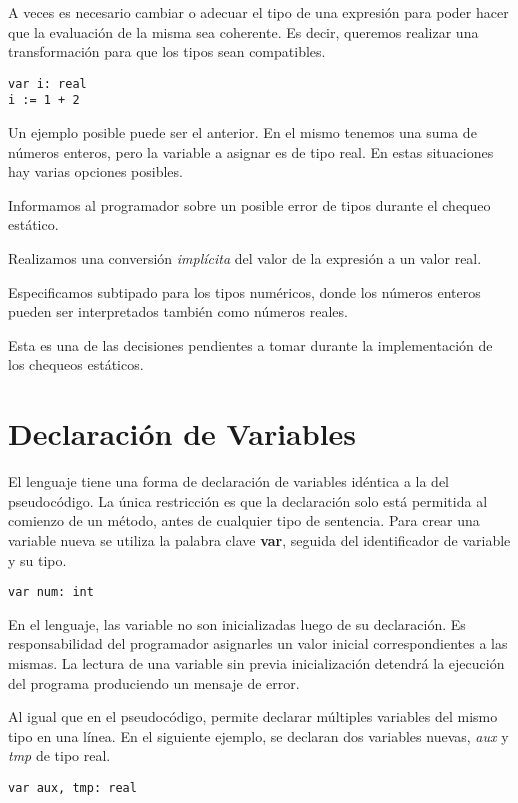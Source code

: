 \documentclass{article}
\begin{document}
A veces es necesario cambiar o adecuar el tipo de una expresión para poder hacer que la evaluación de la misma sea coherente.
Es decir, queremos realizar una transformación para que los tipos sean compatibles.
\begin{lstlisting}
var i: real
i := 1 + 2
\end{lstlisting}

Un ejemplo posible puede ser el anterior.
En el mismo tenemos una suma de números enteros, pero la variable a asignar es de tipo real.
En estas situaciones hay varias opciones posibles.
\begin{enumerate*}
\item
Informamos al programador sobre un posible error de tipos durante el chequeo estático.
\item
Realizamos una conversión \textit{implícita} del valor de la expresión a un valor real.
\item
Especificamos subtipado para los tipos numéricos, donde los números enteros pueden ser interpretados también como números reales.
\end{enumerate*}
Esta es una de las decisiones pendientes a tomar durante la implementación de los chequeos estáticos.

\section{Declaración de Variables}

El lenguaje tiene una forma de declaración de variables idéntica a la del pseudocódigo.
La única restricción es que la declaración solo está permitida al comienzo de un método, antes de cualquier tipo de sentencia.
Para crear una variable nueva se utiliza la palabra clave \textbf{var}, seguida del identificador de variable y su tipo.
\begin{lstlisting}
var num: int
\end{lstlisting}

En el lenguaje, las variable no son inicializadas luego de su declaración.
Es responsabilidad del programador asignarles un valor inicial correspondientes a las mismas.
La lectura de una variable sin previa inicialización detendrá la ejecución del programa produciendo un mensaje de error.

Al igual que en el pseudocódigo, \Lang\space permite declarar múltiples variables del mismo tipo en una línea.
En el siguiente ejemplo, se declaran dos variables nuevas, \textit{aux} y \textit{tmp} de tipo real.
\begin{lstlisting}
var aux, tmp: real
\end{lstlisting}
\end{document}
